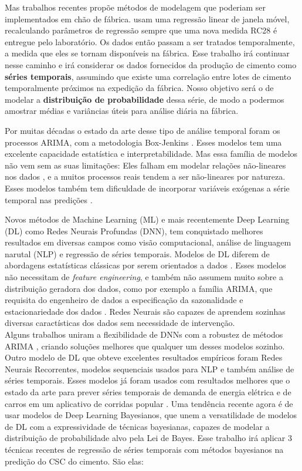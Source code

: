 Mas trabalhos recentes propõe métodos de modelagem que poderiam ser implementados em chão de fábrica. \cite{greciaLin,dynstat} usam uma regressão linear de janela móvel, recalculando parâmetros de regressão sempre que uma nova medida RC28 é entregue pelo laboratório. Os dados então passam a ser tratados temporalmente, a medida que eles se tornam disponíveis na fábrica. Esse trabalho irá continuar nesse caminho e irá considerar os dados fornecidos da produção de cimento como \textbf{séries temporais}, assumindo que existe uma correlação entre lotes de cimento temporalmente próximos na expedição da fábrica. Nosso objetivo será o de modelar a \textbf{distribuição de probabilidade} dessa série, de modo a podermos amostrar médias e variâncias úteis para análise diária na fábrica. 

Por muitas décadas o estado da arte desse tipo de análise temporal foram os processos ARIMA, com a metodologia Box-Jenkins \citep{arima}. Esses modelos tem uma excelente capacidade estatística e interpretabilidade. Mas essa família de modelos não vem sem as suas limitações: Eles falham em modelar relações não-lineares nos dados \citep{forecasting}, e a muitos processos reais tendem a ser não-lineares por natureza. Esses modelos também tem dificuldade de incorporar variáveis exógenas a série temporal nas predições \cite{ubertime}.

Novos métodos de Machine Learning (ML) e mais recentemente Deep Learning (DL) como Redes Neurais Profundas (DNN), tem conquistado melhores resultados em diversas campos como visão computacional, análise de linguagem narutal (NLP) e regressão de séries temporais. Modelos de DL diferem de abordagens estatísticas clássicas por serem orientados a dados \citep{dlbook}. Esses modelos não necessitam de \textit{feature engineering}, e também não assumem muito sobre a distribuição geradora dos dados, como por exemplo a família ARIMA, que requisita do engenheiro de dados a especificação da sazonalidade e estacionariedade dos dados \citep{arima}. Redes Neurais são capazes de aprendem sozinhas diversas caractísticas dos dados sem necessidade de intervenção. \\

Alguns trabalhos uniram a flexibilidade de DNNs com a robustez de métodos ARIMA \citep{DIAZROBLES20088331,KHASHEI2010479}, criando soluções melhores que qualquer um desses modelos sozinho.
Outro modelo de DL que obteve excelentes resultados empíricos foram Redes Neurais Recorrentes, modelos sequenciais usados para NLP e também análise de séries temporais. Esses modelos já foram usados com resultados melhores que o estado da arte para prever séries temporais de demanda de energia elétrica e de carros em um aplicativo de corridas popular \cite{energylstm,ubertime}. Uma tendência recente agora é de usar modelos de Deep Learning Bayesianos, que unem a versatilidade de modelos de DL com a expressividade de técnicas bayesianas, capazes de modelar a distribuição de probabilidade alvo pela Lei de Bayes. Esse trabalho irá aplicar 3 técnicas recentes de regressão de séries temporais com métodos bayesianos na predição do CSC do cimento. São elas:





